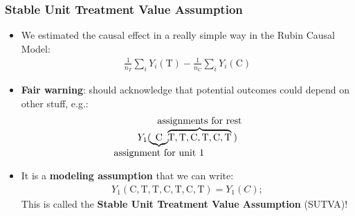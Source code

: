 \documentclass[aspectratio=169]{beamer}
\theoremstyle{principle}
\begin{document}
\begin{frame}
\frametitle{Stable Unit Treatment Value Assumption}
\begin{itemize}
\item We estimated the causal effect in a really simple way in the Rubin Causal Model:%
\begin{align*}
\frac{1}{n_T}\sum_iY_i(\mbox{T}) - \frac{1}{n_C}\sum_iY_i(\mbox{C})
\end{align*}
\item \textbf{Fair warning}: should acknowledge that potential outcomes could depend on other stuff, e.g.:
\begin{align*}
Y_1(\hspace{-13.5mm}\underbrace{\mbox{C}}_{\mbox{assignment for unit 1}}\hspace{-13.5mm},\hspace{-5mm}\overbrace{\mbox{T},\mbox{T},\mbox{C},\mbox{T},\mbox{C},\mbox{T}}^{\mbox{assignments for rest}}\hspace{-3mm})
\end{align*}
\item It is a \textbf{modeling assumption} that we can write:
\begin{align*}
Y_1(\mbox{C},\mbox{T},\mbox{T},\mbox{C},\mbox{T},\mbox{C},\mbox{T}) = Y_1(C);
\end{align*}
This is called the \textbf{Stable Unit Treatment Value Assumption} (SUTVA)!
\end{itemize}
\end{frame}
\end{document}
